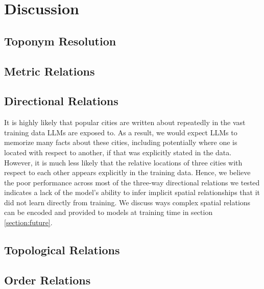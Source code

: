 \section{Discussion}
\label{section:discussion}

\subsection{Toponym Resolution}



\subsection{Metric Relations}




\subsection{Directional Relations}
It is highly likely that popular cities are written about repeatedly in the vast training data LLMs are exposed to.
As a result, we would expect LLMs to memorize many facts about these cities, including potentially where one is located with respect to another, if that was explicitly stated in the data.
However, it is much less likely that the relative locations of three cities with respect to each other appears explicitly in the training data.
Hence, we believe the poor performance across most of the three-way directional relations we tested indicates a lack of the model's ability to infer implicit spatial relationships that it did not learn directly from training.
We discuss ways complex spatial relations can be encoded and provided to models at training time in section \ref{section:future}.


\subsection{Topological Relations}



\subsection{Order Relations}
